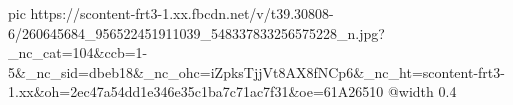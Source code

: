  
 
 
 
 

\ifcmt
  pic https://scontent-frt3-1.xx.fbcdn.net/v/t39.30808-6/260645684_956522451911039_548337833256575228_n.jpg?_nc_cat=104&ccb=1-5&_nc_sid=dbeb18&_nc_ohc=iZpksTjjVt8AX8fNCp6&_nc_ht=scontent-frt3-1.xx&oh=2ec47a54dd1e346e35c1ba7c71ac7f31&oe=61A26510
	@width 0.4
\fi
